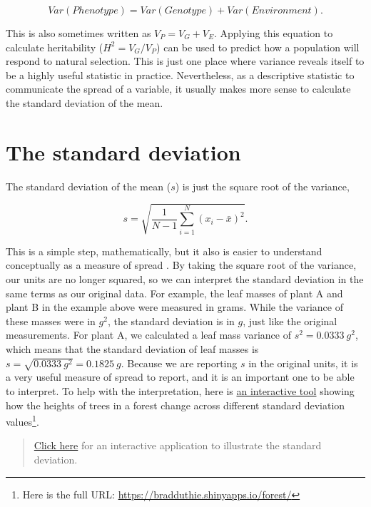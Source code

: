 \documentclass[
]{scrbook}
\begin{document}
\[Var(Phenotype) = Var(Genotype) + Var(Environment).\]

This is also sometimes written as \(V_{P} = V_{G} + V_{E}\).
Applying this equation to calculate heritability (\(H^{2} = V_{G} / V_{P}\)) can be used to predict how a population will respond to natural selection.
This is just one place where variance reveals itself to be a highly useful statistic in practice.
Nevertheless, as a descriptive statistic to communicate the spread of a variable, it usually makes more sense to calculate the standard deviation of the mean.

\hypertarget{the-standard-deviation}{%
\section{The standard deviation}\label{the-standard-deviation}}

The standard deviation of the mean (\(s\)) is just the square root of the variance,

\[s = \sqrt{\frac{1}{N - 1}\sum_{i = 1}^{N}\left(x_{i} - \bar{x} \right)^{2}}.\]

This is a simple step, mathematically, but it also is easier to understand conceptually as a measure of spread \citep{Navarro2022}.
By taking the square root of the variance, our units are no longer squared, so we can interpret the standard deviation in the same terms as our original data.
For example, the leaf masses of plant A and plant B in the example above were measured in grams.
While the variance of these masses were in \(g^{2}\), the standard deviation is in \(g\), just like the original measurements.
For plant A, we calculated a leaf mass variance of \(s^{2} = 0.0333\:g^{2}\), which means that the standard deviation of leaf masses is \(s = \sqrt{0.0333\:g^{2}} = 0.1825\:g\).
Because we are reporting \(s\) in the original units, it is a very useful measure of spread to report, and it is an important one to be able to interpret.
To help with the interpretation, here is \href{https://bradduthie.shinyapps.io/forest/}{an interactive tool} showing how the heights of trees in a forest change across different standard deviation values\footnote{Here is the full URL: \url{https://bradduthie.shinyapps.io/forest/}}.

\begin{quote}
\href{https://bradduthie.shinyapps.io/forest/}{Click here} for an interactive application to illustrate the standard deviation.
\end{quote}
\end{document}
